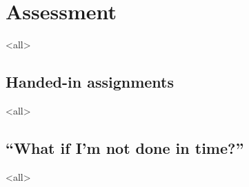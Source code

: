 \section{Assessment}%
\label{Assessment}
\mode<all>{}

\subsection{Handed-in assignments}
\mode<all>{}

\subsection{\enquote{What if I'm not done in time?}}%
\label{sec:late}
\mode<all>{}


\printbibliography
